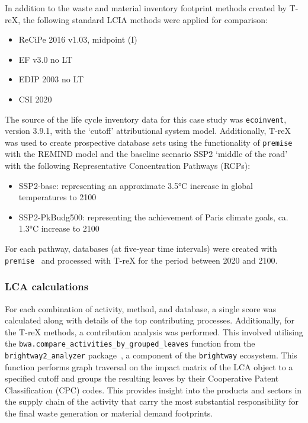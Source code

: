 In addition to the waste and material inventory footprint methods created by T-reX, the following standard LCIA methods were applied for comparison:

\begin{itemize}[itemsep=0pt]
    \item ReCiPe 2016 v1.03, midpoint (I)
    \item EF v3.0 no LT
    \item EDIP 2003 no LT
    \item CSI 2020
\end{itemize}

The source of the life cycle inventory data for this case study was \texttt{ecoinvent}, version 3.9.1, with the `cutoff' attributional system model. Additionally, T-reX was used to create prospective database sets using the functionality of \texttt{premise} with the REMIND model and the baseline scenario SSP2 `middle of the road' with the following Representative Concentration Pathways (RCPs):
\begin{itemize}
    \item SSP2-base: representing an approximate 3.5°C increase in global temperatures to 2100
    \item SSP2-PkBudg500: representing the achievement of Paris climate goals, ca. 1.3°C increase to 2100
\end{itemize}

For each pathway, databases (at five-year time intervals) were created with \texttt{premise}~\citep{sacchi2022premise} and processed with T-reX for the period between 2020 and 2100.

\subsubsection{LCA calculations}
For each combination of activity, method, and database, a single score was calculated along with details of the top contributing processes. Additionally, for the T-reX methods, a contribution analysis was performed. This involved utilising the \texttt{bwa.compare\_activities\_by\_grouped\_leaves} function from the \texttt{brightway2\_analyzer} package~\citep{mutel2016brightway2analyzer}, a component of the \texttt{brightway} ecosystem. This function performs graph traversal on the impact matrix of the LCA object to a specified cutoff and groups the resulting leaves by their Cooperative Patent Classification (CPC) codes. This provides insight into the products and sectors in the supply chain of the activity that carry the most substantial responsibility for the final waste generation or material demand footprints.


